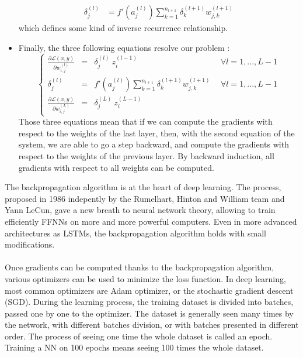 \documentclass{article}
\begin{document}
\begin{itemize}
     \begin{align}
         \delta_j^{(l)} &= f'(a_j^{(l)}) \sum_{k=1}^{n_{l+1}} \delta_k^{(l+1)}  w_{j, k}^{(l+1)} 
        \label{eq:backprop5}
        \end{align}
which defines some kind of inverse recurrence relationship. \newpage
\item Finally, the three following equations resolve our problem :
\[\left \{\begin{array}{cclr}
    \frac{\partial \mathcal{L}(x, y)}{\partial w_{i, j}^{(l)}}
    &= &\delta_j^{(l)} \ z_i^{(l-1)} & \ \ \forall l = 1, ..., L-1\\
    \delta_j^{(l)} 
    &= &f'(a_j^{(l)}) \sum_{k=1}^{n_{l+1}} \delta_k^{(l+1)}  w_{j, k}^{(l+1)} & \ \ \forall l = 1, ..., L-1\\
    \frac{\partial \mathcal{L}(x, y)}{\partial w_{i, j}^{(L)}}
    &= &\delta_j^{(L)} \ z_i^{(L-1)}&
\end{array} \right . \]
Those three equations mean that if we can compute the gradients with respect to the weights 
of the last layer, then, with the second equation of the system, we are able to go a step backward, 
and compute the gradients with respect to the weights of the previous layer. By backward induction, 
all gradients with respect to all weights can be computed. 
\end{itemize}
The backpropagation algorithm is at the heart of deep learning. The process, proposed in 
1986 indepently by the Rumelhart, Hinton and William team and Yann LeCun, gave a new breath 
to neural network theory, allowing to train efficiently FFNNs on more and more powerful computers.
Even in more advanced architectures as LSTMs, the backpropagation algorithm holds with small modifications. \\ \\ 

\noindent Once gradients can be computed thanks to the backpropagation algorithm, 
various optimizers can be used to minimize the loss function. In deep learning, most common 
optimizers are Adam optimizer, or the stochastic gradient descent (SGD). During the learning 
process, the training dataset is divided into batches, passed one by one to the optimizer. 
The dataset is generally seen many times by the network, with different batches division, or with batches presented in 
different order. The process of seeing one time the whole dataset is called an epoch. Training a NN on
100 epochs means seeing 100 times the whole dataset. \\ \\
\end{document}
